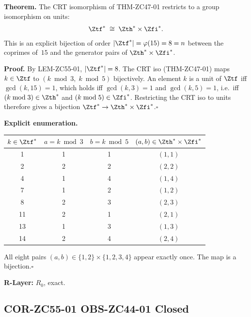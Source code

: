 \documentclass[12pt, a4paper]{article}
\begin{document}
\begin{formalbox}[title={THM-ZC55-01: CRT Bijection Theorem
  (closes OBS-ZC44-01) --- $R_0$, Exact}]
\textbf{Theorem.}
The CRT isomorphism of THM-ZC47-01 restricts to a group isomorphism
on units:
\begin{equation}
  \Ztf^* \;\cong\; \Zth^*\times\Zfi^*.
  \label{eq:crt-units}
\end{equation}
This is an explicit bijection of order
$|\Ztf^*|=\varphi(15)=8=n$ between the coprimes of~$15$ and
the generator pairs of $\Zth^*\times\Zfi^*$.

\medskip
\textbf{Proof.}
By LEM-ZC55-01, $|\Ztf^*|=8$.
The CRT iso (THM-ZC47-01) maps $k\in\Ztf$ to
$(k\bmod3,\;k\bmod5)$ bijectively.
An element $k$ is a unit of $\Ztf$ iff $\gcd(k,15)=1$,
which holds iff $\gcd(k,3)=1$ and $\gcd(k,5)=1$,
i.e.\ iff $(k\bmod3)\in\Zth^*$ and $(k\bmod5)\in\Zfi^*$.
Restricting the CRT iso to units therefore gives a bijection
$\Ztf^*\to\Zth^*\times\Zfi^*$.\hfill$\square$

\medskip
\textbf{Explicit enumeration.}
\begin{center}
\begin{tabular}{@{}cccc@{}}
\toprule
$k\in\Ztf^*$ & $a=k\bmod3$ & $b=k\bmod5$
  & $(a,b)\in\Zth^*\times\Zfi^*$ \\
\midrule
 1 & 1 & 1 & $(1,1)$ \\
 2 & 2 & 2 & $(2,2)$ \\
 4 & 1 & 4 & $(1,4)$ \\
 7 & 1 & 2 & $(1,2)$ \\
 8 & 2 & 3 & $(2,3)$ \\
11 & 2 & 1 & $(2,1)$ \\
13 & 1 & 3 & $(1,3)$ \\
14 & 2 & 4 & $(2,4)$ \\
\bottomrule
\end{tabular}
\end{center}
All eight pairs $(a,b)\in\{1,2\}\times\{1,2,3,4\}$ appear exactly
once.  The map is a bijection.\hfill$\square$

\textbf{R-Layer:} $R_0$, exact.
\end{formalbox}

\subsection{COR-ZC55-01 \quad OBS-ZC44-01 Closed}
\label{sec:cor01}
\end{document}
